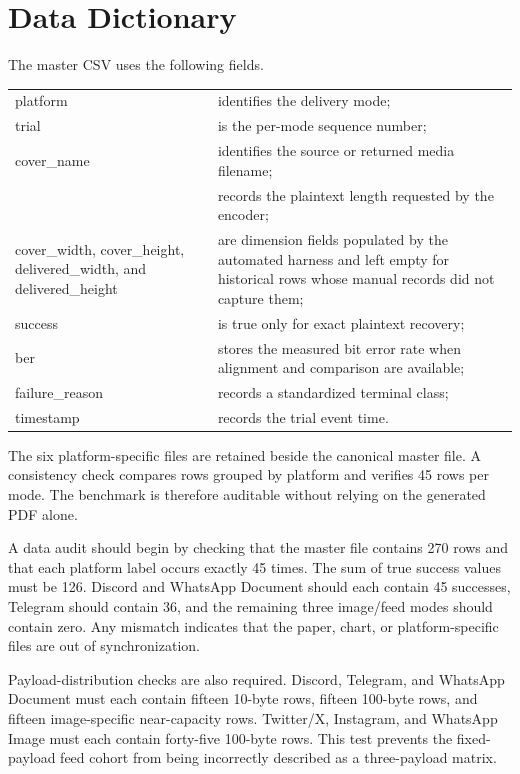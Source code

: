 \documentclass[conference]{IEEEtran}
\newcommand{\safeSection}[1]{\Needspace{5\baselineskip}\section{#1}}
\begin{document}
\safeSection{Data Dictionary}
The master CSV uses the following fields.
\begin{table}[H]
\centering
\footnotesize
\begin{tabularx}{\columnwidth}{@{}>{\ttfamily\raggedright\arraybackslash\scriptsize}p{}Y@{}}
\toprule
platform & identifies the delivery mode; \\
trial & is the per-mode sequence number; \\
cover\_name & identifies the source or returned media filename; \\
 & records the plaintext length requested by the encoder; \\
cover\_width, cover\_height, delivered\_width, and delivered\_height & are dimension fields populated by the automated harness and left empty for historical rows whose manual records did not capture them; \\
success & is true only for exact plaintext recovery; \\
ber & stores the measured bit error rate when alignment and comparison are available; \\
failure\_reason & records a standardized terminal class; \\
timestamp & records the trial event time. \\
\bottomrule
\end{tabularx}
\end{table}

The six platform-specific files are retained beside the canonical master file. A consistency check compares rows grouped by platform and verifies 45 rows per mode. The benchmark is therefore auditable without relying on the generated PDF alone.

A data audit should begin by checking that the master file contains 270 rows and that each platform label occurs exactly 45 times. The sum of true success values must be 126. Discord and WhatsApp Document should each contain 45 successes, Telegram should contain 36, and the remaining three image/feed modes should contain zero. Any mismatch indicates that the paper, chart, or platform-specific files are out of synchronization.

Payload-distribution checks are also required. Discord, Telegram, and WhatsApp Document must each contain fifteen 10-byte rows, fifteen 100-byte rows, and fifteen image-specific near-capacity rows. Twitter/X, Instagram, and WhatsApp Image must each contain forty-five 100-byte rows. This test prevents the fixed-payload feed cohort from being incorrectly described as a three-payload matrix.
\end{document}
